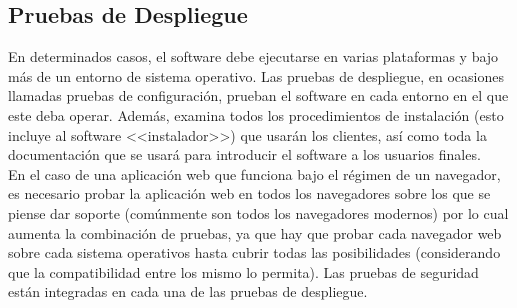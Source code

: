 \subsection{Pruebas de Despliegue}
En determinados casos, el software debe ejecutarse en varias plataformas y bajo más de un entorno de sistema operativo. Las pruebas de despliegue, en ocasiones llamadas pruebas de configuración, prueban el software en cada entorno en el que este deba operar. Además, examina todos los procedimientos de instalación (esto incluye al software <<instalador>>) que usarán los clientes, así como toda la documentación que se usará para introducir el software a los usuarios finales.\\ En el caso de una aplicación web que funciona bajo el régimen de un navegador, es necesario probar la aplicación web en todos los navegadores sobre los que se piense dar soporte (comúnmente son todos los navegadores modernos) por lo cual aumenta la combinación de pruebas, ya que hay que probar cada navegador web sobre cada sistema operativos hasta cubrir todas las posibilidades (considerando que la compatibilidad entre los mismo lo permita). Las pruebas de seguridad están integradas en cada una de las pruebas de despliegue.